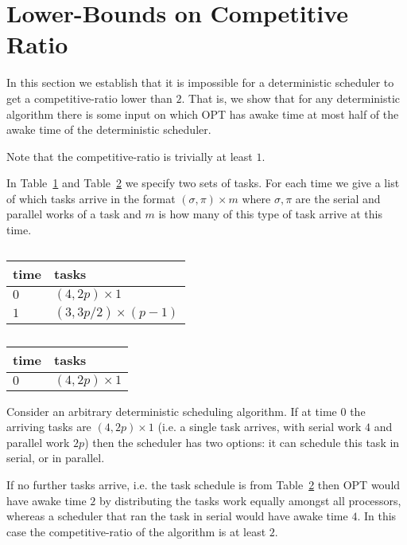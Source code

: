 \documentclass[twocolumn]{article}[11pt]
\begin{document}
\section{Lower-Bounds on Competitive Ratio}

In this section we establish that it is impossible for a
deterministic scheduler to get a competitive-ratio lower than
$2$. That is, we show that for any deterministic algorithm there
is some input on which OPT has awake time at most half of the
awake time of the deterministic scheduler.

Note that the competitive-ratio is trivially at least $1$.

In Table~\ref{tab:lowerboundFork1} and
Table~\ref{tab:lowerboundFork2} we specify two sets of tasks.
For each time we give a list of which tasks arrive in the format
$(\sigma, \pi)\times m$ where $\sigma, \pi$ are the serial and
parallel works of a task and $m$ is how many of this type of task
arrive at this time.

\begin{table}[H]
\caption{}
\label{tab:lowerboundFork1}
\centering
\begin{tabular}{|l|l|}
\hline
time & tasks                    \\ \hline
$0$  & $(4, 2p) \times 1$       \\ \hline
$1$  & $(3, 3p/2) \times (p-1)$ \\ \hline
\end{tabular}
\end{table}

\begin{table}[H]
\caption{}
\label{tab:lowerboundFork2}
\centering
\begin{tabular}{|l|l|}
\hline
time & tasks                    \\ \hline
$0$  & $(4, 2p) \times 1$       \\ \hline
\end{tabular}
\end{table}

Consider an arbitrary deterministic scheduling algorithm. If at
time $0$ the arriving tasks are $(4, 2p)\times 1$ (i.e. a single
task arrives, with serial work $4$ and parallel work $2p$) then
the scheduler has two options: it can schedule this task in
serial, or in parallel.

If no further tasks arrive, i.e. the task schedule is from
Table~\ref{tab:lowerboundFork2} then OPT would have awake time
$2$ by distributing the tasks work equally amongst all
processors, whereas a scheduler that ran the task in serial would
have awake time $4$. In this case the competitive-ratio of the
algorithm is at least $2$.
\end{document}
